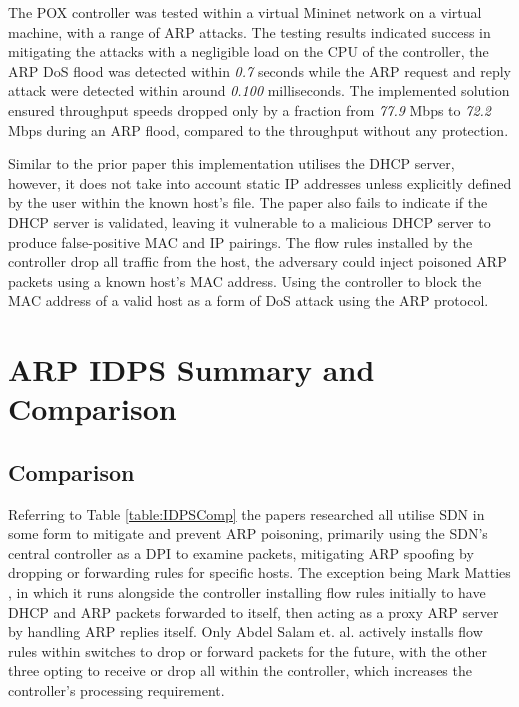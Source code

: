\documentclass[12pt, oneside]{book}
\begin{document}
The POX controller was tested within a virtual Mininet\cite{mininetwebsite} network on a virtual machine, with a range of ARP attacks.
The testing results indicated success in mitigating the attacks with a negligible load on the CPU of the controller,
the ARP DoS flood was detected within \emph{0.7} seconds while the ARP request and reply attack were detected within around \emph{0.100} milliseconds.
The implemented solution ensured throughput speeds dropped only by a fraction from \emph{77.9} Mbps to \emph{72.2} Mbps during an ARP flood,
compared to the throughput without any protection.

Similar to the prior paper this implementation utilises the DHCP server, however, it does not take into account static IP addresses
unless explicitly defined by the user within the known host's file.
The paper also fails to indicate if the DHCP server is validated, leaving it vulnerable to a malicious DHCP server to produce
false-positive MAC and IP pairings. The flow rules installed by the controller drop all traffic from the host,
the adversary could inject poisoned ARP packets using a known host's MAC address. Using the controller to block the MAC address
of a valid host as a form of DoS attack using the ARP protocol.




\newpage
\section{ARP IDPS Summary and Comparison}
\subsection{Comparison}
Referring to Table \ref{table:IDPSComp} the papers researched all utilise SDN in some form to mitigate and prevent ARP poisoning,
primarily using the SDN's central controller as a DPI
to examine packets, mitigating ARP spoofing by dropping or forwarding rules for specific hosts. The exception being Mark Matties
\cite{matties2017distributed}, in
 which it runs alongside the controller installing flow rules initially to have DHCP and
ARP packets forwarded to itself, then acting as a proxy ARP server by handling ARP replies itself. Only Abdel Salam et. al. \cite{abdelsalam2015mitigating}
actively installs flow rules within switches to drop or forward packets for the future, with the other three opting to receive or drop all 
within the controller, which increases the controller's processing requirement.
\end{document}
